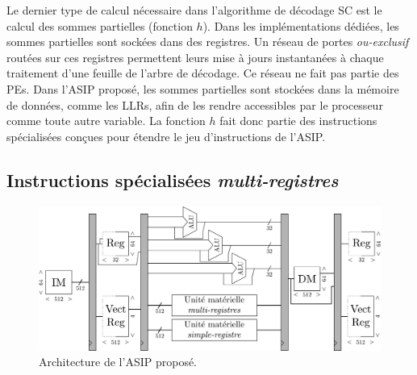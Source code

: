 Le dernier type de calcul nécessaire dans l'algorithme de décodage SC est le calcul des sommes partielles (fonction $h$). Dans les implémentations dédiées, les sommes partielles sont sockées dans des registres. Un réseau de portes \textit{ou-exclusif} routées sur ces registres permettent leurs mise à jours instantanées à chaque traitement d'une feuille de l'arbre de décodage. Ce réseau ne fait pas partie des PEs. Dans l'ASIP proposé, les sommes partielles sont stockées dans la mémoire de données, comme les LLRs, afin de les rendre accessibles par le processeur comme toute autre variable. La fonction $h$ fait donc partie des instructions spécialisées conçues pour étendre le jeu d'instructions de l'ASIP.






\subsection{Instructions spécialisées \textit{multi-registres}}
\label{subsec:multi_reg}

\begin{figure}
\centering
\includegraphics[width=\textwidth]{main/ch3_fig/full_tensilica}
\caption{Architecture de l'ASIP proposé.}
\label{fig:full_tensilica}
\end{figure}

